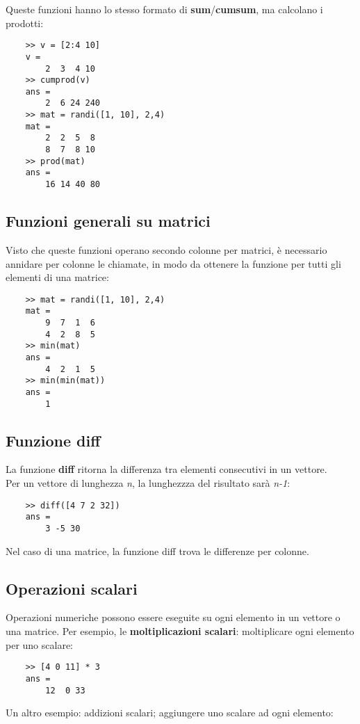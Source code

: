 \documentclass[a4paper, 10pt]{article}
\begin{document}
Queste funzioni hanno lo stesso formato di \textbf{sum}/\textbf{cumsum}, ma calcolano i prodotti:

\begin{lstlisting}
	>> v = [2:4 10]
	v =
		2  3  4 10
	>> cumprod(v)
	ans =
		2  6 24 240
	>> mat = randi([1, 10], 2,4)
	mat =
		2  2  5  8
		8  7  8 10
	>> prod(mat)
	ans =
		16 14 40 80
\end{lstlisting}

\subsection{Funzioni generali su matrici}

Visto che queste funzioni operano secondo colonne per matrici, è necessario annidare per colonne le chiamate, in modo da ottenere la funzione per tutti gli elementi di una matrice:

\begin{lstlisting}
	>> mat = randi([1, 10], 2,4)
	mat =
		9  7  1  6
		4  2  8  5
	>> min(mat)
	ans =
		4  2  1  5
	>> min(min(mat))
	ans =
		1
\end{lstlisting}

\subsection{Funzione diff}

La funzione \textbf{diff} ritorna la differenza tra elementi consecutivi in un vettore. \\
Per un vettore di lunghezza \textit{n}, la lunghezzza del risultato sarà \textit{n-1}:

\begin{lstlisting}
	>> diff([4 7 2 32])
	ans =
		3 -5 30
\end{lstlisting}
Nel caso di una matrice, la funzione diff trova le differenze per colonne.

\subsection{Operazioni scalari}
Operazioni numeriche possono essere eseguite su ogni elemento in un vettore o una matrice.
Per esempio, le \textbf{moltiplicazioni scalari}: moltiplicare ogni elemento per uno scalare:

\begin{lstlisting}
	>> [4 0 11] * 3
	ans =
		12  0 33
\end{lstlisting}
Un altro esempio: addizioni scalari; aggiungere uno scalare ad ogni elemento:
\end{document}
